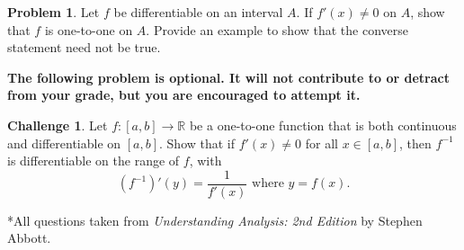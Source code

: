 \documentclass{amsart}
\newcommand{\+}[1]{\ensuremath{\mathbf{#1}}}
\newcommand{\R}{{\mathbb R}}
\theoremstyle{definition}
\newtheorem{prob}{Problem}
\newtheorem{chal}{Challenge}
\begin{document}
\begin{prob}
 Let $f$ be differentiable on an interval $A$.  If $f'(x) \neq 0$ on $A$,
 show that $f$ is one-to-one on $A$.
 Provide an example to show that the converse statement need not be true.
\end{prob}


\vspace{5mm}

{\bf The following problem is optional.  It
will not contribute to or detract from your grade, but you are encouraged
to attempt it.}

\vspace{5mm}

\begin{chal}
Let $f: [a,b] \to \R$ be a one-to-one function that is both continuous and differentiable
on $[a,b]$.
Show that if $f'(x) \neq 0$ for all $x \in [a,b]$, then $f^{-1}$
is differentiable on the range of $f$, with
\[(f^{-1})'(y) = \frac{1}{f'(x)} \text{ where } y=f(x).\]
\end{chal}


\vspace{5mm}

*All questions taken from \emph{Understanding Analysis: 2nd Edition} by Stephen Abbott.
\end{document}
